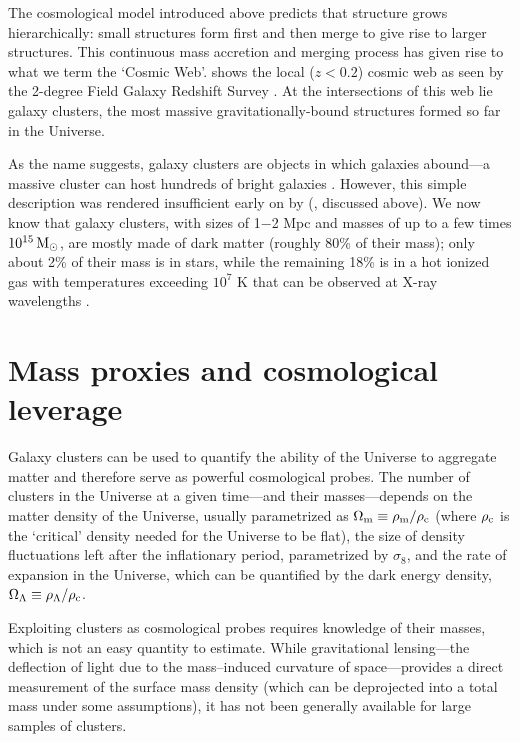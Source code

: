 The cosmological model introduced above predicts that structure grows hierarchically: small structures form first and then merge to give rise to larger structures. This continuous mass accretion and merging process has given rise to what we term the `Cosmic Web'.  shows the local ($z<0.2$) cosmic web as seen by the 2-degree Field Galaxy Redshift Survey \citep{colless01}. At the intersections of this web lie galaxy clusters, the most massive gravitationally-bound structures formed so far in the Universe.

As the name suggests, galaxy clusters are objects in which galaxies abound---a massive cluster can host hundreds of bright galaxies \citep[e.g.,][]{abell58}. However, this simple description was rendered insufficient early on by \citeauthor{zwicky33} (\citeyear{zwicky33}, discussed above). We now know that galaxy clusters, with sizes of 1$-$2 Mpc and masses of up to a few times $10^{15}\,{\rm M}_\odot$, are mostly made of dark matter (roughly 80\% of their mass); only about 2\% of their mass is in stars, while the remaining 18\% is in a hot ionized gas with temperatures exceeding $10^7$ K that can be observed at X-ray wavelengths \citep[e.g.,][]{sarazin86}.


\section{Mass proxies and cosmological leverage}

Galaxy clusters can be used to quantify the ability of the Universe to aggregate matter and therefore serve as powerful cosmological probes. The number of clusters in the Universe at a given time---and their masses---depends on the matter density of the Universe, usually parametrized as $\Omega_{\rm m}\equiv\rho_{\rm m}/\rho_{\rm c}$ (where $\rho_{\rm c}$ is the `critical' density needed for the Universe to be flat), the size of density fluctuations left after the inflationary period, parametrized by $\sigma_8$, and the rate of expansion in the Universe, which can be quantified by the dark energy density, $\Omega_\Lambda\equiv\rho_\Lambda/\rho_{\rm c}$.

Exploiting clusters as cosmological probes requires knowledge of their masses, which is not an easy quantity to estimate. While gravitational lensing---the deflection of light due to the mass--induced curvature of space---provides a direct measurement of the surface mass density (which can be deprojected into a total mass under some assumptions), it has not been generally available for large samples of clusters.

